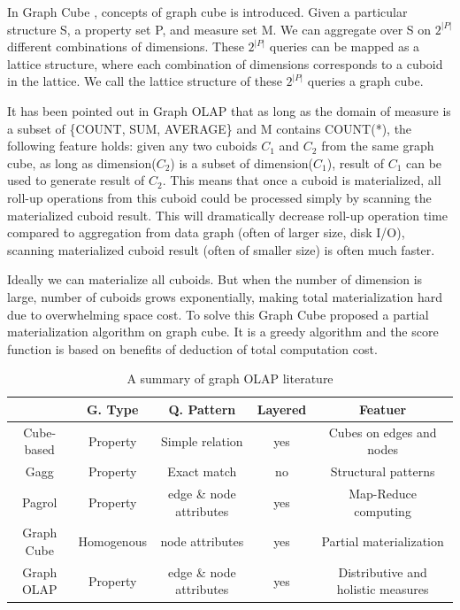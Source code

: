 In Graph Cube \cite{sigmod11_ZhaoLXH11}, concepts of graph cube is introduced. Given a particular structure S, a property set P, and measure set M. We can aggregate over S on $2^{|P|}$ different combinations of dimensions. These $2^{|P|}$ queries can be mapped as a lattice structure, where each combination of dimensions corresponds to a cuboid in the lattice. We call the lattice structure of these $2^{|P|}$ queries a graph cube.


It has been pointed out in  Graph OLAP \cite{icdm08_Chen:2008aa} that as long as the domain of measure is a subset of \{COUNT, SUM, AVERAGE\} and M contains COUNT(*), the following feature holds: given any two cuboids $C_1$ and $C_2$ from the same graph cube, as long as dimension($C_2$) is a subset of dimension($C_1$), result of $C_1$ can be used to generate result of $C_2$. This means that once a cuboid is materialized, all roll-up operations from this cuboid could be processed simply by scanning the materialized cuboid result. This will dramatically decrease roll-up operation time compared to aggregation from data graph (often of larger size, disk I/O), scanning materialized cuboid result (often of smaller size) is often much faster.


Ideally we can materialize all cuboids. But when the number of dimension is large, number of cuboids grows exponentially, making total materialization hard due to overwhelming space cost. To solve this Graph Cube \cite{sigmod11_ZhaoLXH11} proposed a partial materialization algorithm on graph cube. It is a greedy algorithm and the score function is based on benefits of deduction of total computation cost.

\begin{table}
	\footnotesize
	\begin{center}
		\begin{tabular}{ | c | c | c | c | c |  }
			\hline
			& G. Type & Q. Pattern & Layered & Featuer\\ \hline
			Cube-based \cite{DBLP:conf/sofsem/JakawatFL16} & Property & Simple relation & yes & Cubes on edges and nodes\\ \hline
			Gagg \cite{iswc15_Maali:2015aa} & Property & Exact match & no & Structural patterns\\ \hline
			Pagrol \cite{icde14_Wang:2014aa} & Property & edge \& node attributes & yes & Map-Reduce computing\\ \hline
			Graph Cube \cite{sigmod11_ZhaoLXH11} & Homogenous  & node attributes & yes & Partial materialization\\ \hline
			Graph OLAP \cite{icdm08_Chen:2008aa} & Property & edge \& node attributes & yes & Distributive and holistic measures\\ \hline
			
		\end{tabular}
		\end {center}
		\caption{A summary of graph OLAP literature}
	\end{table}
	
